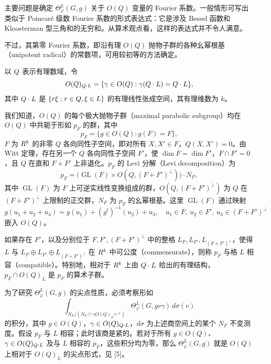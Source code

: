 主要问题是确定 $\Theta_\varphi^L(G,g)$ 关于 $O(Q)$ 变量的 Fourier 系数。一般情形可写出类似于 Poincaré 级数 Fourier 系数的形式表达式：它是涉及 Bessel 函数和 Kloosterman 型三角和的无穷和。从算术观点看，这样的表达式并不令人满意。

不过，其第零 Fourier 系数，即沿有理 $O(Q)$ 抛物子群的各种幺幂根基（unipotent radical）的常数项，可用较初等的方法确定。

以 $Q$ 表示有理数域，令
\[
 O(Q)_{Q\cdot L}=\{\gamma\in O(Q):\gamma(Q\cdot L)=Q\cdot L\},
\]
其中 $Q\cdot L$ 是 $\{r\xi:r\in Q,\xi\in L\}$ 的有理线性张成空间，其有理维数为 $k$。

我们知道，$O(Q)$ 的每个极大抛物子群（maximal parabolic subgroup）均在 $O(Q)$ 中共轭于形如 $p_F$ 的群，其中
\[
 p_F=\{g\in O(Q):g(F)=F\},
\]
$F$ 为 $R^k$ 的非零 $Q$ 各向同性子空间，即对所有 $X,X'\in F$，$Q(X,X')=0$。由 Witt 定理，存在另一个 $Q$ 各向同性子空间 $F'$，使 $\dim F=\dim F'$，$F\cap F'=0$，且 $Q$ 在直和 $F+F'$ 上非退化。$p_F$ 的 Levi 分解（Levi decomposition）为
\[
 p_F=\bigl(\operatorname{GL}(F)\times O(Q,(F+F')^\perp)\bigr)\cdot N_F,
\]
其中 $\operatorname{GL}(F)$ 为 $F$ 上可逆实线性变换组成的群，$O(Q,(F+F')^\perp)$ 为 $Q$ 在 $(F+F')^\perp$ 上限制的正交群，$N_F$ 为 $p_F$ 的幺幂根基。这里 $\operatorname{GL}(F)$ 通过映射
\[
 g(u_1+u_2+u_3)=g(u_1)+(g^t)^{-1}(u_2)+u_3,
 \quad u_1\in F,\ u_2\in F',\ u_3\in(F+F')^\perp
\]
嵌入 $O(Q)$。

如果存在 $F'$，以及分别位于 $F,F',(F+F')^\perp$ 中的整格 $L_F,L_{F'},L_{(F+F')^\perp}$，使得 $L$ 与 $L_F\oplus L_{F'}\oplus L_{(F+F')^\perp}$ 在 $R^k$ 中可公度（commensurate），则称 $p_F$ 与格 $L$ 相容（compatible）。特别地，相对于 $R^k$ 上由 $Q\cdot L$ 给出的有理结构，$p_F\cap O(Q)_L$ 是 $p_F$ 的算术子群。

为了研究 $\Theta_\varphi^L(G,g)$ 的尖点性质，必须考察形如
\begin{equation}
 \int_{N_F/(N_F\cap\gamma O(Q)_L\gamma^{-1})}
 \Theta_\varphi^L(G,gv\gamma)\,d\sigma(v)\tag{4-1}
\end{equation}
的积分，其中 $g\in O(Q)$，$\gamma\in O(Q)_{Q\cdot L}$，$d\sigma$ 为上述商空间上的某个 $N_F$ 不变测度。假设 $p_F$ 与 $L$ 相容；此时该商是紧的。若对于所有 $g\in O(Q)$、$\gamma\in O(Q)_{Q\cdot L}$ 及与 $L$ 相容的 $p_F$，这些积分均为零，那么 $\Theta_\varphi^L(G,g)$ 就是 $O(Q)$ 上相对于 $O(Q)_L$ 的尖点形式，见 [5]。

